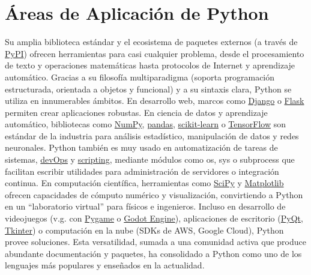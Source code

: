 \section{Áreas de Aplicación de Python}
Su amplia biblioteca estándar y el ecosistema de paquetes externos (a través de \href{https://pypi.org/}{PyPI}) ofrecen herramientas para 
casi cualquier problema, desde el procesamiento de texto y operaciones matemáticas hasta protocolos de Internet y aprendizaje automático. 
Gracias a su filosofía multiparadigma (soporta programación estructurada, orientada a objetos y funcional) y a su sintaxis clara, 
Python se utiliza en innumerables ámbitos. En desarrollo web, marcos como \href{https://www.djangoproject.com/}{Django} o \href{https://flask.palletsprojects.com/en/stable/}{Flask} 
permiten crear aplicaciones robustas. En ciencia de datos y aprendizaje automático, bibliotecas como \href{https://numpy.org/}{NumPy}, 
\href{https://pandas.pydata.org/}{pandas}, \href{https://scikit-learn.org/stable/}{scikit-learn} o \href{https://www.tensorflow.org/learn?hl=es-419}{TensorFlow}
son estándar de la industria para análisis estadístico, manipulación de datos y redes neuronales. Python también es muy usado en 
automatización de tareas de sistemas, \href{https://realpython.com/tutorials/devops/}{devOps} y \href{https://www.redhat.com/en/blog/python-scripting-intro}{scripting}, 
mediante módulos como os, sys o subprocess que facilitan escribir utilidades para  administración de servidores o integración continua. 
En computación científica, herramientas como \href{https://scipy.org/}{SciPy} y \href{https://matplotlib.org/}{Matplotlib} ofrecen capacidades de cómputo numérico y visualización, convirtiendo 
a Python en un “laboratorio virtual” para físicos e ingenieros. Incluso en desarrollo de videojuegos (v.g. con \href{https://www.pygame.org/news}{Pygame} 
o \href{https://godotengine.org/asset-library/asset/3234}{Godot Engine}), aplicaciones de escritorio (\href{https://doc.qt.io/qtforpython-6/}{PyQt}, \href{https://docs.python.org/3/library/tkinter.html}{Tkinter}) 
o computación en la nube (SDKs de AWS, Google Cloud), Python provee soluciones. 
Esta versatilidad, sumada a una comunidad activa que produce abundante documentación y paquetes, ha consolidado a Python como uno de los 
lenguajes más populares y enseñados en la actualidad.


